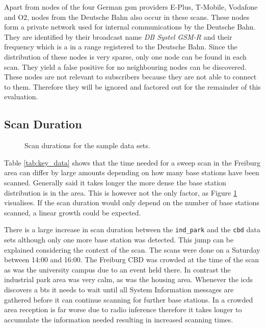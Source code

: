 Apart from nodes of the four German \gls{gsm} providers E-Plus, T-Mobile, Vodafone and O2, nodes from the Deutsche Bahn also occur in these scans.
These nodes form a private network used for internal communications by the Deutsche Bahn.
They are identified by their broadcast name \emph{DB Systel GSM-R} and their frequency which is a in a range registered to the Deutsche Bahn.
Since the distribution of these nodes is very sparse, only one node can be found in each scan. 
They yield a false positive for no neighbouring nodes can be discovered.
These nodes are not relevant to subscribers because they are not able to connect to them.
Therefore they will be ignored and factored out for the remainder of this evaluation.

\subsection{Scan Duration}
\begin{figure}
\centering
{}
\caption{Scan durations for the sample data sets.}
\label{fig:durations}
\end{figure}
Table \ref{tab:key_data} shows that the time needed for a sweep scan in the Freiburg area can differ by large amounts depending on how many base stations have been scanned.
Generally said it takes longer the more dense the base station distribution is in the area.
This is however not the only factor, as Figure \ref{fig:durations} visualises.
If the scan duration would only depend on the number of base stations scanned, a linear growth could be expected.

There is a large increase in scan duration between the \texttt{ind\_park} and the \texttt{cbd} data sets although only one more base station was detected.
This jump can be explained considering the context of the scan.
The scans were done on a Saturday between 14:00 and 16:00.
The Freiburg CBD was crowded at the time of the scan as was the university campus due to an event held there.
In contrast the industrial park area was very calm, as was the housing area.
Whenever the \gls{icds} discovers a \gls{bts} it needs to wait until all System Information messages are gathered before it can continue scanning for further base stations.
In a crowded area reception is far worse due to radio inference therefore it takes longer to accumulate the information needed resulting in increased scanning times.

